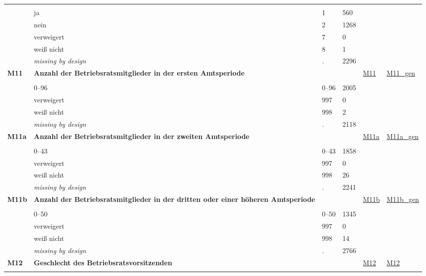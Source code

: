 \begin{longtable}{| L{2.45cm} | L{6cm} | C{1.5cm} | R{1cm} | C{2.25cm} | C{2.25cm} |}
   &  &  &  &  &  \\ 
   & ja & 1 & 560 &  &  \\ 
   & nein & 2 & 1268 &  &  \\ 
   & verweigert & 7 & 0 &  &  \\ 
   & weiß nicht & 8 & 1 &  &  \\ 
   & \textit{missing by design} & \textit{.} & 2296 &  &  \\ 
   \midrule
\textbf{M11}\label{var:M11} & \textbf{Anzahl der Betriebsratsmitglieder in der ersten Amtsperiode} &  &  & \hyperref[M11]{M11} & \hyperref[var:suf:M11:gen]{M11\_gen} \\ 
   &  &  &  &  &  \\ 
   & 0--96 & 0--96 & 2005 &  &  \\ 
   & verweigert & 997 & 0 &  &  \\ 
   & weiß nicht & 998 & 2 &  &  \\ 
   & \textit{missing by design} & \textit{.} & 2118 &  &  \\ 
   \midrule
\textbf{M11a}\label{var:M11a} & \textbf{Anzahl der Betriebsratsmitglieder in der zweiten Amtsperiode} &  &  & \hyperref[M11a]{M11a} & \hyperref[var:suf:M11a:gen]{M11a\_gen} \\ 
   &  &  &  &  &  \\ 
   & 0--43 & 0--43 & 1858 &  &  \\ 
   & verweigert & 997 & 0 &  &  \\ 
   & weiß nicht & 998 & 26 &  &  \\ 
   & \textit{missing by design} & \textit{.} & 2241 &  &  \\ 
   \midrule
\textbf{M11b}\label{var:M11b} & \textbf{Anzahl der Betriebsratsmitglieder in der dritten oder einer höheren Amtsperiode} &  &  & \hyperref[M11b]{M11b} & \hyperref[var:suf:M11b:gen]{M11b\_gen} \\ 
   &  &  &  &  &  \\ 
   & 0--50 & 0--50 & 1345 &  &  \\ 
   & verweigert & 997 & 0 &  &  \\ 
   & weiß nicht & 998 & 14 &  &  \\ 
   & \textit{missing by design} & \textit{.} & 2766 &  &  \\ 
   \midrule
\textbf{M12}\label{var:M12} & \textbf{Geschlecht des Betriebsratsvorsitzenden} &  &  & \hyperref[M12]{M12} & \hyperref[var:suf:M12]{M12} \\ 
   &  &  &  &  &  \\ 

\end{longtable}
